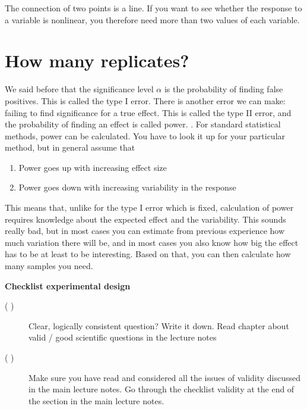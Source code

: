 \documentclass[a4paper,twoside]{tufte-book}\usepackage[]{graphicx}\usepackage[]{color}
\begin{document}
{The connection of two points is a line. If you want to see whether the response to a variable is nonlinear, you therefore need more than two values of each variable.  


\section{How many replicates?}

We said before that the significance level $\alpha$ is the probability of finding false positives. This is called the type I error. There is another error we can make: failing to find significance for a true effect. This is called the type II error, and the probability of finding an effect is called power. . For standard statistical methods, power can be calculated. You have to look it up for your particular method, but in general assume that 

\begin{enumerate}
\item Power goes up with increasing effect size
\item Power goes down with increasing variability in the response
\end{enumerate}

This means that, unlike for the type I error which is fixed, calculation of power requires knowledge about the expected effect and the variability. This sounds really bad, but in most cases you can estimate from previous experience how much variation there will be, and in most cases you also know how big the effect has to be at least to be interesting. Based on that, you can then calculate how many samples you need.

\newpage
\begin{mdframed}
    
\textbf{Checklist experimental design}

\begin{description}

\item[( )] Clear, logically consistent question? Write it down. Read chapter about valid / good scientific questions in the lecture notes

\item[( )] Make sure you have read and considered all the issues of validity discussed in the main lecture notes. Go through the checklist validity at the end of the section in the main lecture notes.


\end{description}
\end{mdframed}}
\end{document}
